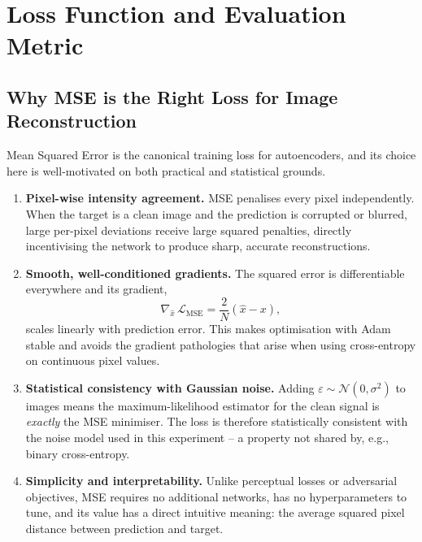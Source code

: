 \documentclass[12pt,a4paper]{article}
\begin{document}
\newpage
\section{Loss Function and Evaluation Metric}

\subsection{Why MSE is the Right Loss for Image Reconstruction}

Mean Squared Error is the canonical training loss for autoencoders, and its
choice here is well-motivated on both practical and statistical grounds.

\begin{enumerate}[leftmargin=*, itemsep=5pt]

  \item \textbf{Pixel-wise intensity agreement.}
        MSE penalises every pixel independently. When the target is a clean
        image and the prediction is corrupted or blurred, large per-pixel
        deviations receive large squared penalties, directly incentivising the
        network to produce sharp, accurate reconstructions.

  \item \textbf{Smooth, well-conditioned gradients.}
        The squared error is differentiable everywhere and its gradient,
        \[
          \nabla_{\hat{x}}\,\mathcal{L}_\text{MSE}
            = \frac{2}{N}(\hat{x} - x),
        \]
        scales linearly with prediction error. This makes optimisation with
        Adam stable and avoids the gradient pathologies that arise when using
        cross-entropy on continuous pixel values.

  \item \textbf{Statistical consistency with Gaussian noise.}
        Adding $\varepsilon \sim \mathcal{N}(0, \sigma^2)$ to images means
        the maximum-likelihood estimator for the clean signal is \emph{exactly}
        the MSE minimiser. The loss is therefore statistically consistent with
        the noise model used in this experiment -- a property not shared by,
        e.g., binary cross-entropy.

  \item \textbf{Simplicity and interpretability.}
        Unlike perceptual losses or adversarial objectives, MSE requires no
        additional networks, has no hyperparameters to tune, and its value
        has a direct intuitive meaning: the average squared pixel distance
        between prediction and target.

\end{enumerate}
\end{document}
